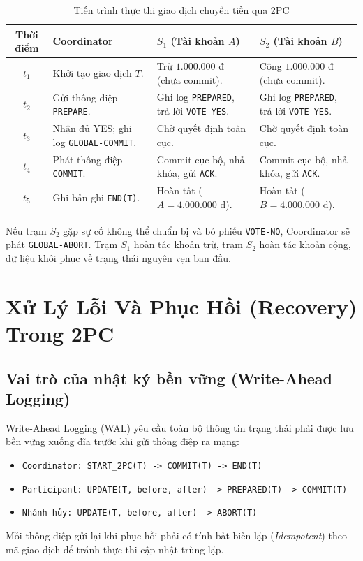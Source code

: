 \documentclass[12pt,a4paper]{report}
\begin{document}
\begin{table}[!ht]
\centering
\small
\caption{Tiến trình thực thi giao dịch chuyển tiền qua 2PC}
\label{tab:transfer_2pc_example}
\renewcommand{\arraystretch}{1.2}
\begin{tabularx}{\textwidth}{|c|>{\raggedright\arraybackslash}X|>{\raggedright\arraybackslash}X|>{\raggedright\arraybackslash}X|}
\hline
\textbf{Thời điểm} & \textbf{Coordinator} & \textbf{$S_1$ (Tài khoản $A$)} & \textbf{$S_2$ (Tài khoản $B$)} \\ \hline
$t_1$ & Khởi tạo giao dịch $T$. & Trừ $1.000.000$ đ (chưa commit). & Cộng $1.000.000$ đ (chưa commit). \\ \hline
$t_2$ & Gửi thông điệp \texttt{PREPARE}. & Ghi log \texttt{PREPARED}, trả lời \texttt{VOTE-YES}. & Ghi log \texttt{PREPARED}, trả lời \texttt{VOTE-YES}. \\ \hline
$t_3$ & Nhận đủ YES; ghi log \texttt{GLOBAL-COMMIT}. & Chờ quyết định toàn cục. & Chờ quyết định toàn cục. \\ \hline
$t_4$ & Phát thông điệp \texttt{COMMIT}. & Commit cục bộ, nhả khóa, gửi \texttt{ACK}. & Commit cục bộ, nhả khóa, gửi \texttt{ACK}. \\ \hline
$t_5$ & Ghi bản ghi \texttt{END(T)}. & Hoàn tất ($A = 4.000.000$ đ). & Hoàn tất ($B = 4.000.000$ đ). \\ \hline
\end{tabularx}
\end{table}

Nếu trạm $S_2$ gặp sự cố không thể chuẩn bị và bỏ phiếu \texttt{VOTE-NO}, Coordinator sẽ phát \texttt{GLOBAL-ABORT}. Trạm $S_1$ hoàn tác khoản trừ, trạm $S_2$ hoàn tác khoản cộng, dữ liệu khôi phục về trạng thái nguyên vẹn ban đầu.

\section{Xử Lý Lỗi Và Phục Hồi (Recovery) Trong 2PC}

\subsection{Vai trò của nhật ký bền vững (Write-Ahead Logging)}
Write-Ahead Logging (WAL) yêu cầu toàn bộ thông tin trạng thái phải được lưu bền vững xuống đĩa trước khi gửi thông điệp ra mạng:
\begin{itemize}[leftmargin=0.8cm, topsep=1pt, itemsep=1pt]
    \item \texttt{Coordinator: START\_2PC(T) -> COMMIT(T) -> END(T)}
    \item \texttt{Participant: UPDATE(T, before, after) -> PREPARED(T) -> COMMIT(T)}
    \item \texttt{Nhánh hủy:   UPDATE(T, before, after) -> ABORT(T)}
\end{itemize}
Mỗi thông điệp gửi lại khi phục hồi phải có tính bất biến lặp (\textit{Idempotent}) theo mã giao dịch để tránh thực thi cập nhật trùng lặp.
\end{document}
